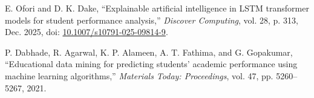 \documentclass[12pt,a4paper]{article}
\begin{document}
\begin{enumerate}[label={[\arabic*]}, leftmargin=1.5em]
	\item E. Ofori and D. K. Dake, ``Explainable artificial intelligence in LSTM transformer models for student performance analysis,'' \textit{Discover Computing}, vol. 28, p. 313, Dec. 2025, doi: \href{https://doi.org/10.1007/s10791-025-09814-9}{10.1007/s10791-025-09814-9}.

	\item P. Dabhade, R. Agarwal, K. P. Alameen, A. T. Fathima, and G. Gopakumar, ``Educational data mining for predicting students' academic performance using machine learning algorithms,'' \textit{Materials Today: Proceedings}, vol. 47, pp. 5260--5267, 2021.
\end{enumerate}
\end{document}
